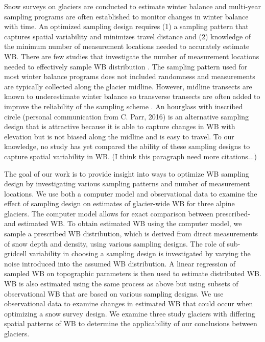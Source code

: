 \documentclass[twocolumn,letterpaper]{igs}
\begin{document}
Snow surveys on glaciers are conducted to estimate winter balance and multi-year sampling programs are often established to monitor changes in winter balance with time. An optimized sampling design requires (1) a sampling pattern that captures spatial variability and minimizes travel distance and (2) knowledge of the minimum number of measurement locations needed to accurately estimate WB. There are few studies that investigate the number of measurement locations needed to effectively sample WB distribution \citep[c.f.][]{Fountain1999,Walmsley2015}. The sampling pattern used for most winter balance programs does not included randomness and measurements are typically collected along the glacier midline. However, midline transects are known to underestimate winter balance so transverse transects are often added to improve the reliability of the sampling scheme \citep[e.g.][]{Walmsley2015}. An hourglass with inscribed circle (personal communication from C. Parr, 2016) is an alternative sampling design that is attractive because it is able to capture changes in WB with elevation but is not biased along the midline and is easy to travel. To our knowledge, no study has yet compared the ability of these sampling designs to capture spatial variability in WB.  (I think this paragraph need more citations...)

The goal of our work is to provide insight into ways to optimize WB sampling design by investigating various sampling patterns and number of measurement locations. We use both a computer model and observational data to examine the effect of sampling design on estimates of glacier-wide WB for three alpine glaciers. The computer model allows for exact comparison between prescribed- and estimated WB. To obtain estimated WB using the computer model, we sample a prescribed WB distribution, which is derived from direct measurements of snow depth and density, using various sampling designs. The role of sub-gridcell variability in choosing a sampling design is investigated by varying the noise introduced into the assumed WB distribution. A linear regression of sampled WB on topographic parameters is then used to estimate distributed WB. WB is also estimated using the same process as above but using subsets of observational WB that are based on various sampling designs. We use observational data to examine changes in estimated WB that could occur when optimizing a snow survey design. We examine three study glaciers with differing spatial patterns of WB to determine the applicability of our conclusions between glaciers. 
\end{document}
